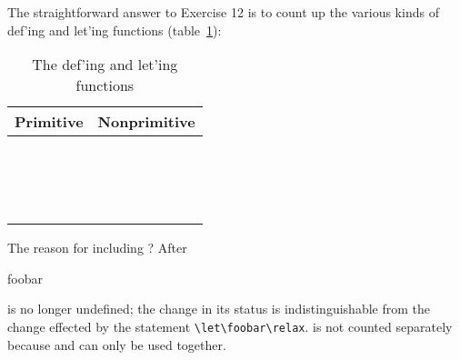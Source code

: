 The straightforward answer to Exercise 12 is to count up the various
kinds of def'ing and let'ing functions (table~\ref{tab:deflet}):
\begin{comment}
\begin{lcode}
Primitive:          Nonprimitive:

\def                \newcount
\edef               \newdimen
\gdef               \newskip
\xdef               \newmuskip
\let                \newfam
\futurelet          \newwrite
\chardef            \newread
\mathchardef        \newbox
\countdef           \newtoks
\dimendef           \newinsert
\skipdef            \newlanguage
\muskipdef          \newif
\toksdef            \newhelp
\font               
\read
\csname
\end{lcode}
\end{comment}
\begin{table}
\centering
\caption{The def'ing and let'ing functions}\label{tab:deflet}
\begin{tabular}{ll} \toprule
Primitive          &  Nonprimitive       \\ \midrule
\cmd{\def}         &  \cmd{\newcount}    \\
\cmd{\edef}        &  \cmd{\newdimen}    \\
\cmd{\gdef}        &  \cmd{\newskip}     \\
\cmd{\xdef}        &  \cmd{\newmuskip}   \\
\cmd{\let}         &  \cmd{\newfam}      \\
\cmd{\futurelet}   &  \cmd{\newwrite}    \\
\cmd{\chardef}     &  \cmd{\newread}     \\
\cmd{\mathchardef} &  \cmd{\newbox}      \\
\cmd{\countdef}    &  \cmd{\newtoks}     \\
\cmd{\dimendef}    &  \cmd{\newinsert}   \\
\cmd{\skipdef}     &  \cmd{\newlanguage} \\
\cmd{\muskipdef}   &  \cmd{\newif}       \\
\cmd{\toksdef}     &  \cmd{\newhelp}     \\
\cmd{\font}        &  \\             
\cmd{\read}        &  \\
\cmd{\csname}      &  \\
  \bottomrule
\end{tabular}
\end{table}

The reason for including \cmd{\csname}? After 
\begin{lcode}
    \csname foobar\endcsname
\end{lcode}
\cmd{\foobar} is no longer undefined; the change in its status is
indistinguishable from the change effected by the statement
\verb?\let\foobar\relax?. \cmd{\endcsname} is not counted separately because
\cmd{\csname} and \cmd{\endcsname} can only be used together.

